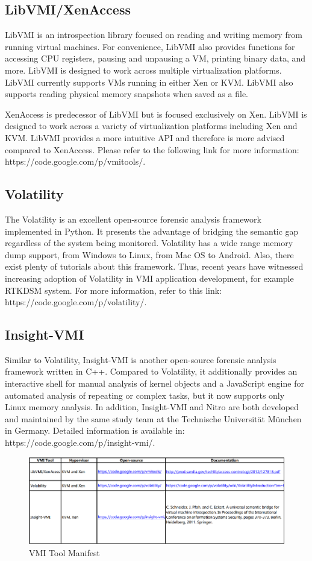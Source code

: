 \subsection{LibVMI/XenAccess  \cite{Reference10,Reference11}}

LibVMI is an introspection library focused on reading and writing memory from running virtual machines. For convenience, LibVMI also provides 
functions for accessing CPU registers, pausing and unpausing a VM, printing binary data, and more. LibVMI is designed to work across multiple 
virtualization platforms. LibVMI currently supports VMs running in either Xen or KVM. LibVMI also supports reading physical memory snapshots 
when saved as a file.

XenAccess is predecessor of LibVMI but is focused exclusively on Xen. LibVMI is designed to work across a variety of virtualization platforms
including Xen and KVM. LibVMI provides a more intuitive API and therefore is more advised compared to XenAccess. Please refer to the following
link for more information: https://code.google.com/p/vmitools/. 

\subsection{Volatility  \cite{Reference13}}

The Volatility is an excellent open-source forensic analysis framework implemented in Python. It presents the advantage of bridging the 
semantic gap regardless of the system being monitored. Volatility has a wide range memory dump support, from Windows to Linux, from Mac OS
to Android. Also, there exist plenty of tutorials about this framework. Thus, recent years have witnessed increasing adoption of Volatility
in VMI application development, for example RTKDSM system. For more information, refer to this link: https://code.google.com/p/volatility/.

\subsection{Insight-VMI  \cite{Reference14,Reference15}}

Similar to Volatility, Insight-VMI is another open-source forensic analysis framework written in C++. Compared to Volatility, it additionally
provides an interactive shell for manual analysis of kernel objects and a JavaScript engine for automated analysis of repeating or complex 
tasks, but it now supports only Linux memory analysis. In addition, Insight-VMI and Nitro are both developed and maintained by the same study
team at the Technische Universität München in Germany. Detailed information is available in: https://code.google.com/p/insight-vmi/.

\begin{figure}[htbp]
	\centering
		\includegraphics{Figures/Figure3.pdf}
	\caption[VMI Tool Manifest]{VMI Tool Manifest}
	\label{fig:VMI Tool Manifest}
\end{figure}